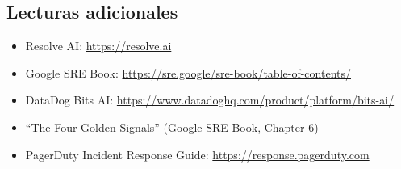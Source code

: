 \subsection{Lecturas adicionales}

\begin{itemize}
    \item Resolve AI: \url{https://resolve.ai}
    \item Google SRE Book: \url{https://sre.google/sre-book/table-of-contents/}
    \item DataDog Bits AI: \url{https://www.datadoghq.com/product/platform/bits-ai/}
    \item ``The Four Golden Signals'' (Google SRE Book, Chapter 6)
    \item PagerDuty Incident Response Guide: \url{https://response.pagerduty.com}
\end{itemize}



